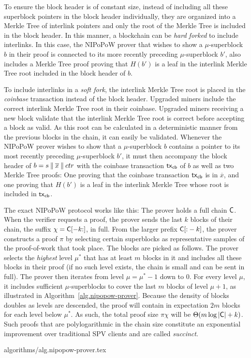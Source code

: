 To ensure the block header is of constant size, instead of including all these
superblock pointers in the block header individually, they are organized into a
Merkle Tree of interlink pointers and only the root of the Merkle Tree is
included in the block header. In this manner, a blockchain can be \emph{hard
forked} to include interlinks. In this case, the NIPoPoW prover that wishes to
show a $\mu$-superblock $b$ in their proof is connected to its more recently
preceding $\mu$-superblock $b'$, also includes a Merkle Tree proof proving that
$H(b')$ is a leaf in the interlink Merkle Tree root included in the block header
of $b$.

To include interlinks in a \emph{soft fork}, the interlink Merkle Tree root is
placed in the \emph{coinbase} transaction instead of the block header. Upgraded
miners include the correct interlink Merkle Tree root in their coinbase.
Upgraded miners receiving a new block validate that the interlink Merkle Tree
root is correct before accepting a block as valid. As this root can be
calculated in a deterministic manner from the previous blocks in the chain, it
can easily be validated. Whenever the NIPoPoW prover wishes to show that a
$\mu$-superblock $b$ contains a pointer to its most recently preceding
$\mu$-superblock $b'$, it must then accompany the block header of $b = s \mathbin{\|}
\overline{x} \mathbin{\|} ctr$ with the coinbase transaction $\mathsf{tx}_{\mathsf{cb}}$ of $b$ as well
as two Merkle Tree proofs: One proving that the coinbase transaction $\mathsf{tx}_{\mathsf{cb}}$
is in $\overline{x}$, and one proving that $H(b')$ is a leaf in the interlink
Merkle Tree whose root is included in $\mathsf{tx}_{\mathsf{cb}}$.

The exact NIPoPoW protocol works like this: The prover holds a full chain
$\mathsf{C}$. When the verifier requests a proof, the prover sends the last $k$
blocks of their chain, the suffix $\chi = \mathsf{C}[-k{:}]$, in full. From the
larger prefix $\mathsf{C}[{:}-k]$, the prover constructs a proof $\pi$ by selecting
certain superblocks as representative samples of the proof-of-work that took
place. The blocks are picked as follows. The prover selects the \emph{highest}
level $\mu^*$ that has at least $m$ blocks in it and includes all these blocks
in their proof (if no such level exists, the chain is small and can be sent in
full). The prover then iterates from level $\mu = \mu^* - 1$ down to $0$. For
every level $\mu$, it includes sufficient $\mu$-superblocks to cover the last
$m$ blocks of level $\mu + 1$, as illustrated in
Algorithm~\ref{alg.nipopow-prover}. Because the density of blocks doubles as
levels are descended, the proof will contain in expectation $2m$ blocks for each
level below $\mu^*$. As such, the total proof size $\pi \chi$ will be
$\Theta(m\log|\mathsf{C}| + k)$. Such proofs that are polylogarithmic in the chain
size constitute an exponential improvement over traditional SPV clients and are
called \emph{succinct}.

{algorithms/alg.nipopow-prover.tex}

